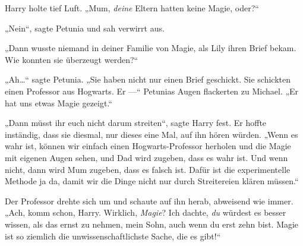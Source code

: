 Harry holte tief Luft. „Mum, \emph{deine} Eltern hatten keine Magie, oder?“

„Nein“, sagte Petunia und sah verwirrt aus.

„Dann wusste niemand in deiner Familie von Magie, als Lily ihren Brief bekam. Wie konnten sie überzeugt werden?“

„Ah…“ sagte Petunia. „Sie haben nicht nur einen Brief geschickt. Sie schickten einen Professor aus Hogwarts. Er —“ Petunias Augen flackerten zu Michael. „Er hat uns etwas Magie gezeigt.“

„Dann müsst ihr euch nicht darum streiten“, sagte Harry fest. Er hoffte inständig, dass sie diesmal, nur dieses eine Mal, auf ihn hören würden. „Wenn es wahr ist, können wir einfach einen Hogwarts-Professor herholen und die Magie mit eigenen Augen sehen, und Dad wird zugeben, dass es wahr ist. Und wenn nicht, dann wird Mum zugeben, dass es falsch ist. Dafür ist die experimentelle Methode ja da, damit wir die Dinge nicht nur durch Streitereien klären müssen.“

Der Professor drehte sich um und schaute auf ihn herab, abweisend wie immer. „Ach, komm schon, Harry. Wirklich, \emph{Magie}? Ich dachte, \emph{du} würdest es besser wissen, als das ernst zu nehmen, mein Sohn, auch wenn du erst zehn bist. Magie ist so ziemlich die unwissenschaftlichste Sache, die es gibt!“

